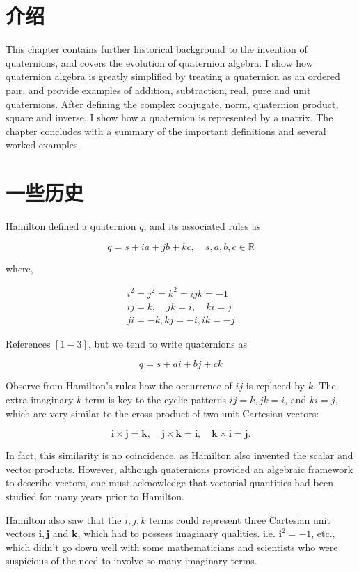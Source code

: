 
\section{介绍}
This chapter contains further historical background to the invention of quaternions, and covers the evolution of quaternion algebra. I show how quaternion algebra is greatly simplified by treating a quaternion as an ordered pair, and provide examples of addition, subtraction, real, pure and unit quaternions. After defining the complex conjugate, norm, quaternion product, square and inverse, I show how a quaternion is represented by a matrix. The chapter concludes with a summary of the important definitions and several worked examples.

\section{一些历史}
Hamilton defined a quaternion $q$, and its associated rules as

$$
    q=s+i a+j b+k c, \quad s, a, b, c \in \mathbb{R}
$$

where,

$$
    \begin{gathered}
        i^{2}=j^{2}=k^{2}=i j k=-1 \\
        i j=k, \quad j k=i, \quad k i=j \\
        j i=-k, k j=-i, i k=-j
    \end{gathered}
$$

References $[1-3]$, but we tend to write quaternions as

$$
    q=s+a i+b j+c k
$$

Observe from Hamilton's rules how the occurrence of $i j$ is replaced by $k$. The extra imaginary $k$ term is key to the cyclic patterns $i j=k, j k=i$, and $k i=j$, which are very similar to the cross product of two unit Cartesian vectors:

$$
    \mathbf{i} \times \mathbf{j}=\mathbf{k}, \quad \mathbf{j} \times \mathbf{k}=\mathbf{i}, \quad \mathbf{k} \times \mathbf{i}=\mathbf{j} .
$$

In fact, this similarity is no coincidence, as Hamilton also invented the scalar and vector products. However, although quaternions provided an algebraic framework to describe vectors, one must acknowledge that vectorial quantities had been studied for many years prior to Hamilton.

Hamilton also saw that the $i, j, k$ terms could represent three Cartesian unit vectors $\mathbf{i}, \mathbf{j}$ and $\mathbf{k}$, which had to possess imaginary qualities. i.e. $\mathbf{i}^{2}=-1$, etc., which didn't go down well with some mathematicians and scientists who were suspicious of the need to involve so many imaginary terms.

